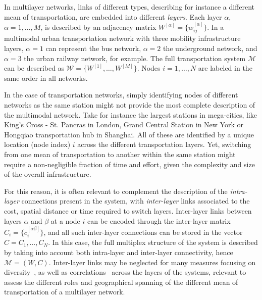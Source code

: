 In multilayer networks, links of different types, describing for instance a different mean of transportation, are embedded into different \textit{layers}. Each layer $\alpha$, $\alpha = 1, \ldots, M$, is described by an adjacency matrix $W^{[\alpha]} = \{w_{ij}^{[\alpha]}\}$. In a multimodal urban transportation network with three mobility infrastructure layers, $\alpha=1$ can represent the bus network, $\alpha=2$ the underground network, and $\alpha=3$ the urban railway network, for example. The full transportation system $\mathcal M$ can be described as $\mathcal W = \{ W^{[1]}, \ldots,  W^{[M]}\}$. Nodes $i=1, \dots, N$ are labeled in the same order in all networks. 

In the case of transportation networks, simply identifying nodes of different networks as the same station might not provide the most complete description of the multimodal network. Take for instance the largest stations in mega-cities, like King's Cross - St. Pancras in London, Grand Central Station in New York or Hongqiao transportation hub in Shanghai. All of these are identified by a unique location (node index) $i$ across the different transportation layers. Yet, switching from one mean of transportation to another within the same station might require a non-negligible fraction of time and effort, given the complexity and size of the overall infrastructure. 

For this reason, it is often relevant to complement the description of the \textit{intra-layer} connections present in the system, with \textit{inter-layer} links associated to the cost, spatial distance or time required to switch layers. Inter-layer links between layers $\alpha$ and $\beta$ at a node $i$ can be encoded through the inter-layer matrix $C_i=\{c_i^{[\alpha \beta]} \}$, and all such inter-layer connections can be stored in the vector $ C = {C_1, \ldots, C_N}$. In this case, the full multiplex structure of the system is described by taking into account both intra-layer and inter-layer connectivity, hence $\mathcal M = ( W,  C)$. Inter-layer links may be neglected for many measures focusing on diversity~\cite{battiston2014structural}, as well as correlations~\cite{nicosia2015measuring} across the layers of the systems, relevant to assess the different roles and geographical spanning of the different mean of transportation of a multilayer network. 

